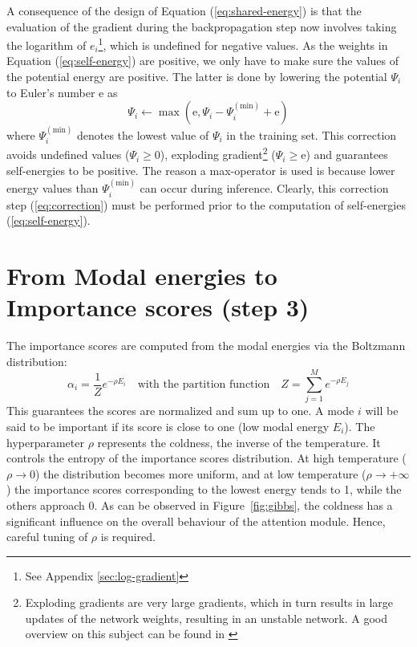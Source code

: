 A consequence of the design of Equation (\ref{eq:shared-energy}) is that the evaluation of the gradient during the backpropagation step now involves taking the logarithm of $e_i$\footnote{See Appendix \ref{sec:log-gradient}}, which is undefined for negative values. As the weights in Equation (\ref{eq:self-energy}) are positive, we only have to make sure the values of the potential energy are positive. The latter is done by lowering the potential $\Psi_i$ to Euler's number $\mathrm{e}$ as
\begin{equation}
\Psi_i \leftarrow \max(\mathrm{e}, \Psi_i - \Psi_i^{(\text{min})} + \mathrm{e})
\label{eq:correction}
\end{equation}
where $\Psi_i^{(\text{min})}$ denotes the lowest value of $\Psi_i$ in the training set. This correction avoids undefined values ($\Psi_i \geq 0$), exploding gradient\footnote{Exploding gradients are very large gradients, which in turn results in large updates of the network weights, resulting in an unstable network. A good overview on this subject can be found in \citep{exploding}} ($\Psi_i \geq \mathrm{e}$) and guarantees self-energies to be positive. The reason a max-operator is used is because lower energy values than $\Psi_i^{(\text{min})}$  can occur during inference. Clearly, this correction step (\ref{eq:correction}) must be performed prior to the computation of self-energies (\ref{eq:self-energy}).


\section{From Modal energies to Importance scores (step 3)}\label{sec:step3}
The importance scores are computed from the modal energies via the Boltzmann distribution:
\begin{equation}
\alpha_i = \frac{1}{Z}e^{-\rho E_i} \quad \text{with the partition function} \quad Z = \sum_{j=1}^M e^{-\rho E_j} 
\label{eq:gibbs-distrib}
\end{equation}
This guarantees the scores are normalized and sum up to one. A mode $i$ will be said to be important if its score is close to one (low modal energy $E_i$). The hyperparameter $\rho$ represents the coldness, the inverse of the temperature. It controls the entropy of the importance scores distribution. At high temperature ($\rho \rightarrow 0$) the distribution becomes more uniform, and at low temperature ($\rho \rightarrow +\infty$) the importance scores corresponding to the lowest energy tends to 1, while the others approach 0. As can be observed in Figure \,\ref{fig:gibbs}, the coldness has a significant influence on the overall behaviour of the attention module. Hence, careful tuning of $\rho$ is required.

